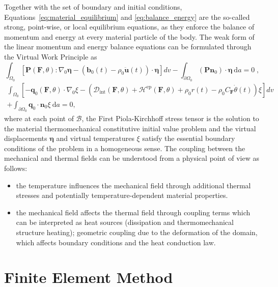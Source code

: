Together with the set of boundary and initial conditions, Equations~\eqref{eq:material_equilibrium} and \eqref{eq:balance_energy} are the so-called strong, point-wise, or local equilibrium equations, as they enforce the balance of momentum and energy at every material particle of the body.
The weak form of the linear momentum and energy balance equations can be formulated through the Virtual Work Principle as
\begin{equation} \label{eq:weak_momentum_balance}
  \int_{\Omega_0} [\bm{P}(\bm{F},\theta):\nabla_0 \bm{\eta} - (\bm{b}_0(t)-\rho_0\ddot{\bm{u}}(t))\cdot \bm{\eta}]d v - \int_{\partial\Omega_0} (\bm{P}\bm{n}_{0})\cdot \bm{\eta} \ \mathrm{d} a = 0\;,
\end{equation}
\begin{multline} \label{eq:weak_energy_balance}
  \int_{\Omega_0}   \left[-\bm{q}_{0}(\bm{F},\theta)\cdot \nabla_0 \xi - \left(\mathcal D_\text{int}(\bm{F},\theta)+\mathcal H^\text{ep}(\bm{F},\theta)+ \rho_0 r(t)-\rho_0C_{\bm F}\dot\theta(t)\right) \xi\right]d v\\ + \int_{\partial\Omega_0} \bm{q}_{0}\cdot \bm{n}_{0} \xi \ \mathrm{d} a = 0,
\end{multline}
where at each point of $\mathscr{B}$, the First Piola-Kirchhoff stress tensor is the solution to the material thermomechanical constitutive initial value problem and the virtual displacements \(\bm{\eta}\) and virtual temperatures \(\xi\) satisfy the essential boundary conditions of the problem in a homogeneous sense.
The coupling between the mechanical and thermal fields can be understood from a physical point of view as follows:
\begin{itemize}
\item the temperature influences the mechanical field through additional thermal stresses and potentially temperature-dependent material properties.
\item  the mechanical field affects the thermal field through coupling terms which can be interpreted as heat sources (dissipation and thermomechanical structure heating); geometric coupling due to the deformation of the domain, which affects boundary conditions and the heat conduction law.
\end{itemize}

\section{Finite Element Method} \label{sec:fem_mech}

